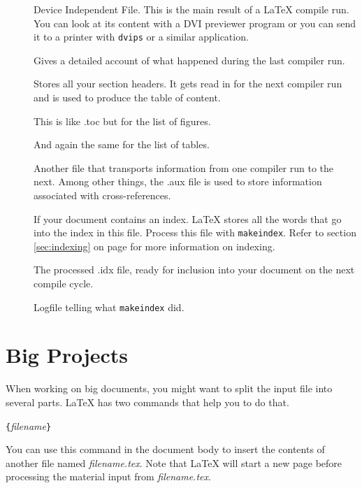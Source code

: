 \begin{description}
\item[] Device Independent File. This is the main result of a \LaTeX{}
  compile run. You can look at its content with a DVI previewer
  program or you can send it to a printer with \texttt{dvips} or a
  similar application.
\item[] Gives a detailed account of what happened during the
  last compiler run.
\item[] Stores all your section headers. It gets read in for the
  next compiler run and is used to produce the table of content.
\item[] This is like .toc but for the list of figures.
\item[] And again the same for the list of tables.
\item[] Another file that transports information from one
  compiler run to the next. Among other things, the .aux file is used
  to store information associated with cross-references.
\item[] If your document contains an index. \LaTeX{} stores all
  the words that go into the index in this file. Process this file with
  \texttt{makeindex}. Refer to section \ref{sec:indexing} on
  page \pageref{sec:indexing} for more information on indexing.
\item[] The processed .idx file, ready for inclusion into your
  document on the next compile cycle.
\item[] Logfile telling what \texttt{makeindex} did.
\end{description}


%
%



%

\section{Big Projects}
When working on big documents, you might want to split the input file
into several parts. \LaTeX{} has two commands that help you to do
that.

\begin{lscommand}
\verb|{|\emph{filename}\verb|}|
\end{lscommand}
\noindent You can use this command in the document body to insert the
contents of another file named \emph{filename.tex}. Note that \LaTeX{}
will start a new page
before processing the material input from \emph{filename.tex}.

